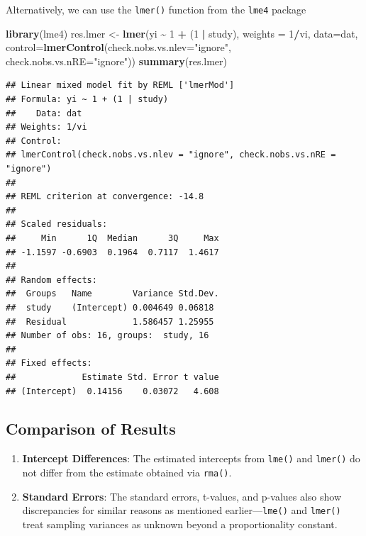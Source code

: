 \documentclass[
]{book}
\newenvironment{Shaded}{\begin{snugshade}}{\end{snugshade}}
\newcommand{\AttributeTok}[1]{\textcolor[rgb]{0.13,0.29,0.53}{#1}}
\newcommand{\DecValTok}[1]{\textcolor[rgb]{0.00,0.00,0.81}{#1}}
\newcommand{\FunctionTok}[1]{\textcolor[rgb]{0.13,0.29,0.53}{\textbf{#1}}}
\newcommand{\NormalTok}[1]{#1}
\newcommand{\OtherTok}[1]{\textcolor[rgb]{0.56,0.35,0.01}{#1}}
\newcommand{\SpecialCharTok}[1]{\textcolor[rgb]{0.81,0.36,0.00}{\textbf{#1}}}
\newcommand{\StringTok}[1]{\textcolor[rgb]{0.31,0.60,0.02}{#1}}
\begin{document}
Alternatively, we can use the \texttt{lmer()} function from the \texttt{lme4} package

\begin{Shaded}
\begin{Highlighting}[]
\FunctionTok{library}\NormalTok{(lme4)}
\NormalTok{res.lmer }\OtherTok{\textless{}{-}} \FunctionTok{lmer}\NormalTok{(yi }\SpecialCharTok{\textasciitilde{}} \DecValTok{1} \SpecialCharTok{+}\NormalTok{ (}\DecValTok{1} \SpecialCharTok{|}\NormalTok{ study), }\AttributeTok{weights =} \DecValTok{1}\SpecialCharTok{/}\NormalTok{vi, }\AttributeTok{data=}\NormalTok{dat,}
                 \AttributeTok{control=}\FunctionTok{lmerControl}\NormalTok{(}\AttributeTok{check.nobs.vs.nlev=}\StringTok{"ignore"}\NormalTok{, }\AttributeTok{check.nobs.vs.nRE=}\StringTok{"ignore"}\NormalTok{))}
\FunctionTok{summary}\NormalTok{(res.lmer)}
\end{Highlighting}
\end{Shaded}

\begin{verbatim}
## Linear mixed model fit by REML ['lmerMod']
## Formula: yi ~ 1 + (1 | study)
##    Data: dat
## Weights: 1/vi
## Control: 
## lmerControl(check.nobs.vs.nlev = "ignore", check.nobs.vs.nRE = "ignore")
## 
## REML criterion at convergence: -14.8
## 
## Scaled residuals: 
##     Min      1Q  Median      3Q     Max 
## -1.1597 -0.6903  0.1964  0.7117  1.4617 
## 
## Random effects:
##  Groups   Name        Variance Std.Dev.
##  study    (Intercept) 0.004649 0.06818 
##  Residual             1.586457 1.25955 
## Number of obs: 16, groups:  study, 16
## 
## Fixed effects:
##             Estimate Std. Error t value
## (Intercept)  0.14156    0.03072   4.608
\end{verbatim}

\subsection{Comparison of Results}\label{comparison-of-results-1}

\begin{enumerate}
\def\labelenumi{\arabic{enumi}.}
\item
  \textbf{Intercept Differences}: The estimated intercepts from \texttt{lme()} and \texttt{lmer()} do not differ from the estimate obtained via \texttt{rma()}.
\item
  \textbf{Standard Errors}: The standard errors, t-values, and p-values also show discrepancies for similar reasons as mentioned earlier---\texttt{lme()} and \texttt{lmer()} treat sampling variances as unknown beyond a proportionality constant.
\end{enumerate}
\end{document}
